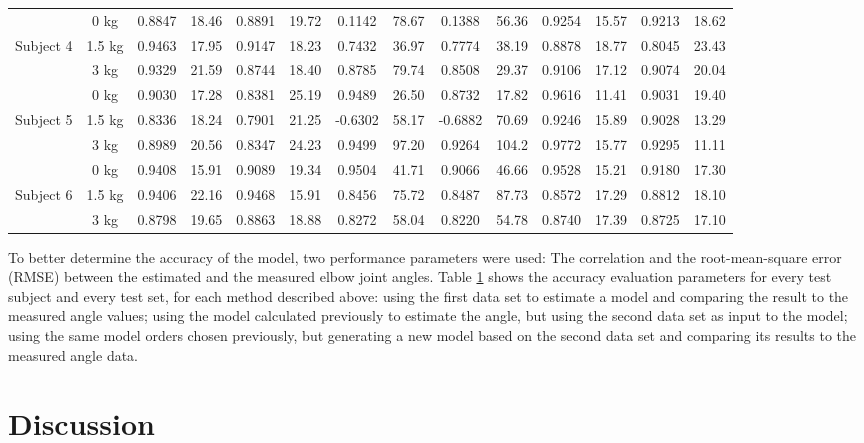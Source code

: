 \documentclass[letterpaper, 10 pt, conference]{ieeeconf}  %
\begin{document}
\begin{table}[h]
{\begin{tabular}{|c c|c c|c c|c c|c c|c c|c c|}
& 0 kg &0.8847 &18.46 &0.8891 &19.72 & 0.1142 & 78.67 & 0.1388 & 56.36 &0.9254 &15.57 &0.9213 &18.62\\
Subject 4 & 1.5 kg &0.9463 &17.95 &0.9147 &18.23 & 0.7432 & 36.97 & 0.7774 & 38.19 &0.8878 &18.77 &0.8045 &23.43\\
& 3 kg &0.9329 &21.59 &0.8744 &18.40 & 0.8785 & 79.74 & 0.8508 & 29.37 &0.9106 &17.12 &0.9074 &20.04\\
\hline

& 0 kg &0.9030 &17.28 &0.8381 &25.19 & 0.9489 & 26.50 & 0.8732 & 17.82 &0.9616 &11.41 &0.9031 &19.40 \\
Subject 5 & 1.5 kg &0.8336 &18.24 &0.7901 &21.25 & -0.6302 & 58.17 & -0.6882 & 70.69 &0.9246 &15.89 &0.9028 &13.29\\
& 3 kg & 0.8989 &20.56 &0.8347 &24.23& 0.9499 & 97.20 & 0.9264 & 104.2 &0.9772 &15.77 &0.9295 &11.11\\
\hline

& 0 kg &0.9408 &15.91 &0.9089 &19.34 & 0.9504 & 41.71 & 0.9066 & 46.66 &0.9528 &15.21 &0.9180 &17.30\\
Subject 6 & 1.5 kg &0.9406 &22.16 &0.9468 &15.91 & 0.8456 & 75.72 & 0.8487 & 87.73 &0.8572 &17.29 &0.8812 &18.10 \\
& 3 kg & 0.8798 & 19.65 &0.8863 &18.88 & 0.8272 & 58.04 & 0.8220 & 54.78 &0.8740 &17.39 &0.8725 &17.10\\
\hline


\end{tabular}%
}
\centering

\label{ta:corr}
\end{table}

To better determine the accuracy of the model, two performance parameters were used: The correlation and the root-mean-square error (RMSE) between the estimated and the measured elbow joint angles. Table \ref{ta:corr} shows the accuracy evaluation parameters for every test subject and every test set, for each method described above: using the first data set to estimate a model and comparing the result to the measured angle values; using the model calculated previously to estimate the angle, but using the second data set as input to the model; using the same model orders chosen previously, but generating a new model based on the second data set and comparing its results to the measured angle data.


\section{Discussion}
\end{document}
